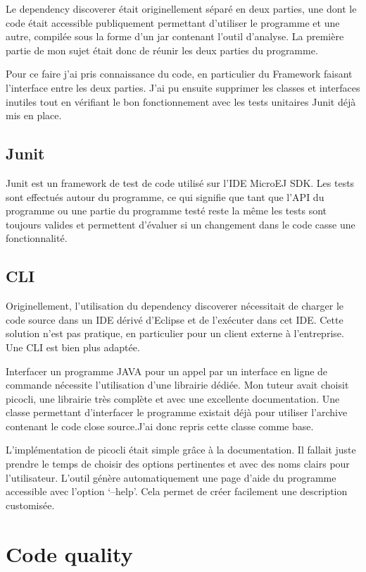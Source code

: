 \documentclass[french,a4paper,12pt]{report}
\begin{document}
Le dependency discoverer était originellement séparé en deux parties, une dont le code était accessible publiquement permettant d'utiliser le programme et une autre, compilée sous la forme d'un jar contenant l'outil d'analyse. La première partie de mon sujet était donc de réunir les deux parties du programme.

Pour ce faire j'ai pris connaissance du code, en particulier du Framework faisant l'interface entre les deux parties. J'ai pu ensuite supprimer les classes et interfaces inutiles tout en vérifiant le bon fonctionnement avec les tests unitaires Junit déjà mis en place.

\subsection{Junit}

Junit est un framework de test de code utilisé sur l’IDE MicroEJ SDK. Les tests sont effectués autour du programme, ce qui signifie que tant que l’API du programme ou une partie du programme testé reste la même les tests sont toujours valides et permettent d’évaluer si un changement dans le code casse une fonctionnalité.

\subsection{CLI}

Originellement, l'utilisation du dependency discoverer nécessitait de charger le code source dans un IDE dérivé d'Eclipse et de l’exécuter dans cet IDE. Cette solution n'est pas pratique, en particulier pour un client externe à l'entreprise. Une CLI est bien plus adaptée.

Interfacer un programme JAVA pour un appel par un interface en ligne de commande nécessite l’utilisation d’une librairie dédiée. Mon tuteur avait choisit picocli, une librairie très complète et avec une excellente documentation. Une classe permettant d’interfacer le programme existait déjà pour utiliser l’archive contenant le code close source.J’ai donc repris cette classe comme base. 

L’implémentation de picocli était simple grâce à la documentation. Il fallait juste prendre le temps de choisir  des options pertinentes et avec des noms clairs pour l’utilisateur. L’outil génère automatiquement une page d’aide du programme accessible avec l’option ‘--help’. Cela permet de créer facilement une description customisée.

\section{Code quality}
\end{document}
